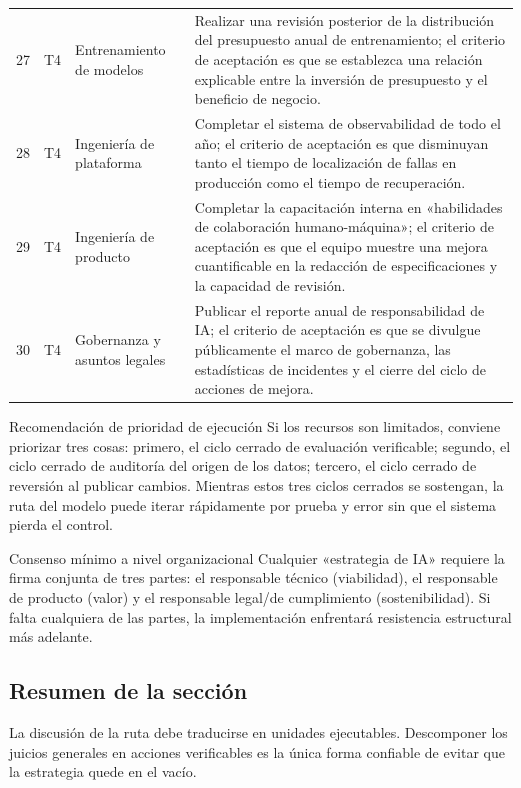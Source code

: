 \begin{longtable}{p{}p{}p{}p{}}
27 & T4 & Entrenamiento de modelos & Realizar una revisión posterior de la distribución del presupuesto anual de entrenamiento; el criterio de aceptación es que se establezca una relación explicable entre la inversión de presupuesto y el beneficio de negocio. \\
28 & T4 & Ingeniería de plataforma & Completar el sistema de observabilidad de todo el año; el criterio de aceptación es que disminuyan tanto el tiempo de localización de fallas en producción como el tiempo de recuperación. \\
29 & T4 & Ingeniería de producto & Completar la capacitación interna en «habilidades de colaboración humano-máquina»; el criterio de aceptación es que el equipo muestre una mejora cuantificable en la redacción de especificaciones y la capacidad de revisión. \\
30 & T4 & Gobernanza y asuntos legales & Publicar el reporte anual de responsabilidad de IA; el criterio de aceptación es que se divulgue públicamente el marco de gobernanza, las estadísticas de incidentes y el cierre del ciclo de acciones de mejora. \\
\bottomrule
\end{longtable}

\begin{importantbox}{Recomendación de prioridad de ejecución}
Si los recursos son limitados, conviene priorizar tres cosas: primero, el ciclo cerrado de evaluación verificable; segundo, el ciclo cerrado de auditoría del origen de los datos; tercero, el ciclo cerrado de reversión al publicar cambios. Mientras estos tres ciclos cerrados se sostengan, la ruta del modelo puede iterar rápidamente por prueba y error sin que el sistema pierda el control.
\end{importantbox}

\begin{knowledgebox}{Consenso mínimo a nivel organizacional}
Cualquier «estrategia de IA» requiere la firma conjunta de tres partes: el responsable técnico (viabilidad), el responsable de producto (valor) y el responsable legal/de cumplimiento (sostenibilidad). Si falta cualquiera de las partes, la implementación enfrentará resistencia estructural más adelante.
\end{knowledgebox}

\subsection{Resumen de la sección}

La discusión de la ruta debe traducirse en unidades ejecutables. Descomponer los juicios generales en acciones verificables es la única forma confiable de evitar que la estrategia quede en el vacío.

